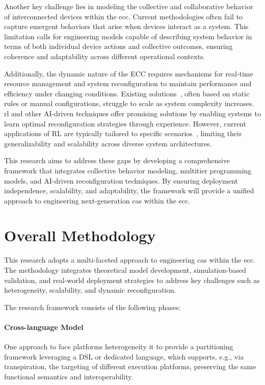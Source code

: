\documentclass[runningheads]{llncs}
\begin{document}
Another key challenge lies in modeling the collective and collaborative behavior of interconnected devices within the \ac{ecc}.
%
Current methodologies often fail to capture emergent behaviors that arise when devices interact as a system.
%
This limitation calls for engineering models capable of describing system behavior in terms of both individual device actions and collective outcomes,
ensuring coherence and adaptability across different operational contexts.

Additionally,
the dynamic nature of the ECC requires mechanisms for real-time resource management and system reconfiguration to maintain performance and efficiency under changing conditions.
%
Existing solutions~\cite{DBLP:conf/isola/CabriCCNPTZ14},
often based on static rules or manual configurations, struggle to scale as system complexity increases.
%
\ac{rl} and other AI-driven techniques offer promising solutions by enabling systems to learn optimal reconfiguration strategies through experience.
%
However,
current applications of RL are typically tailored to specific scenarios~\cite{DBLP:journals/tpds/JayanettiHB24},
limiting their generalizability and scalability across diverse system architectures.

This research aims to address these gaps by developing a comprehensive framework that integrates collective behavior modeling,
multitier programming models,
and AI-driven reconfiguration techniques.
%
By ensuring deployment independence,
scalability,
and adaptability,
the framework will provide a unified approach to engineering next-generation \ac{cas} within the \ac{ecc}.

\section{Overall Methodology}
\label{sec:methodology}

This research adopts a multi-faceted approach to engineering \ac{cas} within the \ac{ecc}.
%
The methodology integrates theoretical model development,
simulation-based validation,
and real-world deployment strategies to address key challenges such as heterogeneity, scalability, and dynamic reconfiguration.

The research framework consists of the following phases:
\paragraph{Cross-language Model}
    One approach to face platforms heterogeneity it to provide a partitioning framework leveraging a DSL or dedicated language,
    which supports, e.g., via transpiration,
    the targeting of different execution platforms,
    preserving the same functional semantics and interoperability.
\end{document}

